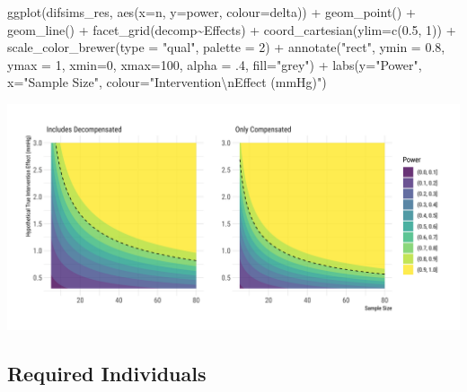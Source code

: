 \documentclass[
]{article}
\newenvironment{Shaded}{\begin{snugshade}}{\end{snugshade}}
\newcommand{\AttributeTok}[1]{\textcolor[rgb]{0.77,0.63,0.00}{#1}}
\newcommand{\DecValTok}[1]{\textcolor[rgb]{0.00,0.00,0.81}{#1}}
\newcommand{\FloatTok}[1]{\textcolor[rgb]{0.00,0.00,0.81}{#1}}
\newcommand{\FunctionTok}[1]{\textcolor[rgb]{0.00,0.00,0.00}{#1}}
\newcommand{\NormalTok}[1]{#1}
\newcommand{\SpecialCharTok}[1]{\textcolor[rgb]{0.00,0.00,0.00}{#1}}
\newcommand{\StringTok}[1]{\textcolor[rgb]{0.31,0.60,0.02}{#1}}
\begin{document}
\begin{Shaded}
\begin{Highlighting}[]
\FunctionTok{ggplot}\NormalTok{(difsims\_res, }\FunctionTok{aes}\NormalTok{(}\AttributeTok{x=}\NormalTok{n, }\AttributeTok{y=}\NormalTok{power, }\AttributeTok{colour=}\NormalTok{delta)) }\SpecialCharTok{+}
  \FunctionTok{geom\_point}\NormalTok{() }\SpecialCharTok{+} 
  \FunctionTok{geom\_line}\NormalTok{() }\SpecialCharTok{+}
  \FunctionTok{facet\_grid}\NormalTok{(decomp}\SpecialCharTok{\textasciitilde{}}\NormalTok{Effects) }\SpecialCharTok{+}
  \FunctionTok{coord\_cartesian}\NormalTok{(}\AttributeTok{ylim=}\FunctionTok{c}\NormalTok{(}\FloatTok{0.5}\NormalTok{, }\DecValTok{1}\NormalTok{)) }\SpecialCharTok{+}
  \FunctionTok{scale\_color\_brewer}\NormalTok{(}\AttributeTok{type =} \StringTok{"qual"}\NormalTok{, }\AttributeTok{palette =} \DecValTok{2}\NormalTok{) }\SpecialCharTok{+}
  \FunctionTok{annotate}\NormalTok{(}\StringTok{"rect"}\NormalTok{, }\AttributeTok{ymin =} \FloatTok{0.8}\NormalTok{, }\AttributeTok{ymax =} \DecValTok{1}\NormalTok{, }\AttributeTok{xmin=}\DecValTok{0}\NormalTok{, }
           \AttributeTok{xmax=}\DecValTok{100}\NormalTok{, }\AttributeTok{alpha =}\NormalTok{ .}\DecValTok{4}\NormalTok{, }\AttributeTok{fill=}\StringTok{"grey"}\NormalTok{) }\SpecialCharTok{+}
  \FunctionTok{labs}\NormalTok{(}\AttributeTok{y=}\StringTok{"Power"}\NormalTok{, }\AttributeTok{x=}\StringTok{"Sample Size"}\NormalTok{, }
       \AttributeTok{colour=}\StringTok{"Intervention}\SpecialCharTok{\textbackslash{}n}\StringTok{Effect (mmHg)"}\NormalTok{)}
\end{Highlighting}
\end{Shaded}

\includegraphics{figures/unnamed-chunk-61-1.png}

\hypertarget{required-individuals}{%
\subsection{Required Individuals}\label{required-individuals}}
\end{document}
